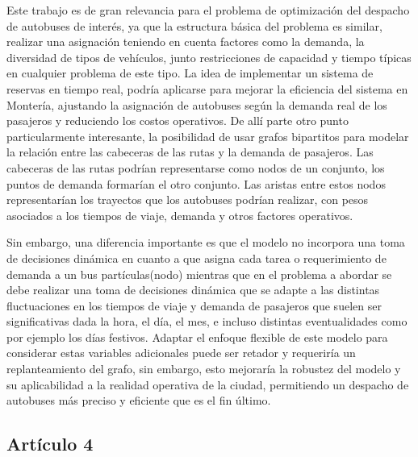 \documentclass[preprint,11pt]{elsarticle}
\begin{document}
Este trabajo es de gran relevancia para el problema de optimización del despacho de autobuses de interés, ya que la estructura básica del problema es similar, realizar una asignación teniendo en cuenta factores como la demanda, la diversidad de tipos de vehículos, junto restricciones de capacidad y tiempo típicas en cualquier problema de este tipo. La idea de implementar un sistema de reservas en tiempo real, podría aplicarse para mejorar la eficiencia del sistema en Montería, ajustando la asignación de autobuses según la demanda real de los pasajeros y reduciendo los costos operativos. De allí parte otro punto particularmente interesante, la posibilidad de usar grafos bipartitos para modelar la relación entre las cabeceras de las rutas y la demanda de pasajeros. Las cabeceras de las rutas podrían representarse como nodos de un conjunto, los puntos de demanda formarían el otro conjunto. Las aristas entre estos nodos representarían los trayectos que los autobuses podrían realizar, con pesos asociados a los tiempos de viaje, demanda y otros factores operativos.

Sin embargo, una diferencia importante es que el modelo no incorpora una toma de decisiones dinámica en cuanto a que asigna cada tarea o requerimiento de demanda a un bus partículas(nodo) mientras que en el problema a abordar se debe realizar una toma de decisiones dinámica que se adapte a las distintas fluctuaciones en los tiempos de viaje y demanda de pasajeros que suelen ser significativas dada la hora, el día, el mes, e incluso distintas eventualidades como por ejemplo los días festivos. Adaptar el enfoque flexible de este modelo para considerar estas variables adicionales puede ser retador y requeriría un replanteamiento del grafo, sin embargo, esto mejoraría la robustez del modelo y su aplicabilidad a la realidad operativa de la ciudad, permitiendo un despacho de autobuses más preciso y eficiente que es el fin último.

\subsection*{Artículo 4}
\end{document}
